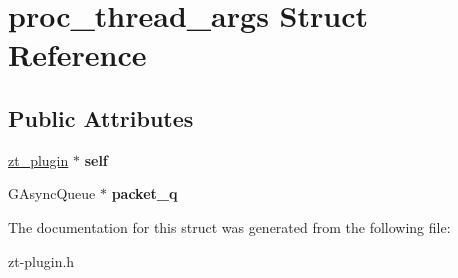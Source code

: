\hypertarget{structproc__thread__args}{\section{proc\-\_\-thread\-\_\-args Struct Reference}
\label{structproc__thread__args}
}
\subsection*{Public Attributes}
\begin{DoxyCompactItemize}
\item 
\hypertarget{structproc__thread__args_ae8f7a92c44c57b5f2550b2ff0474631c}{\hyperlink{struct__zt__plugin}{zt\-\_\-plugin} $\ast$ {\bfseries self}}\label{structproc__thread__args_ae8f7a92c44c57b5f2550b2ff0474631c}

\item 
\hypertarget{structproc__thread__args_a6e3ae04b15901c8e3d5e9328e547e010}{G\-Async\-Queue $\ast$ {\bfseries packet\-\_\-q}}\label{structproc__thread__args_a6e3ae04b15901c8e3d5e9328e547e010}

\end{DoxyCompactItemize}


The documentation for this struct was generated from the following file\-:\begin{DoxyCompactItemize}
\item 
zt-\/plugin.\-h\end{DoxyCompactItemize}
